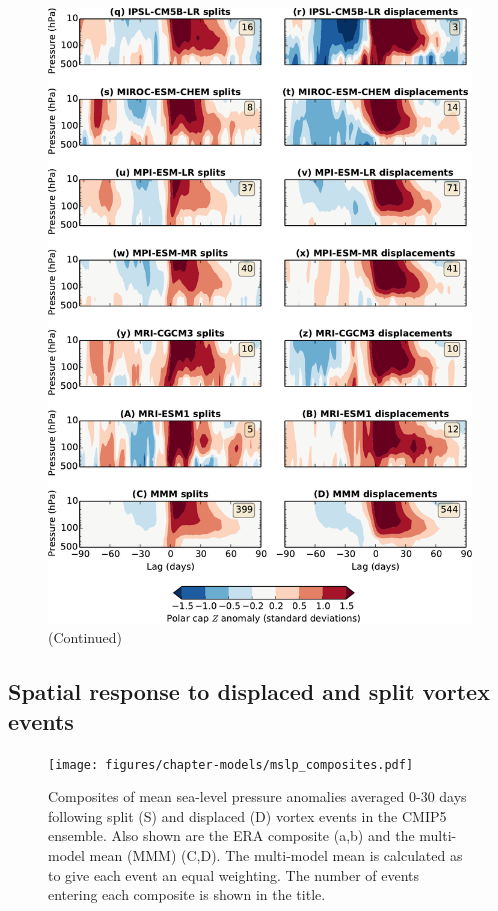 \begin{figure}
 \ContinuedFloat
 \centering
 \noindent\includegraphics[width=\textwidth]{figures/chapter-models/dripping_paint2.pdf}
 \caption[]{(Continued)}
\end{figure}


\subsection{Spatial response to displaced and split vortex events}

\begin{figure}
 \centering
 \noindent\texttt{[image: figures/chapter-models/mslp\_composites.pdf]}
 \caption[MSLP following split and displaced vortex events]{Composites of mean
   sea-level pressure anomalies averaged 0-30 days following split (S) and
   displaced (D) vortex events in the CMIP5 ensemble. Also shown are the ERA
   composite (a,b) and the multi-model mean (MMM) (C,D). The multi-model mean is
   calculated as to give each event an equal weighting. The number of events
   entering each composite is shown in the title.}
 \label{fig:cmip5_mslp_comp}
\end{figure}

